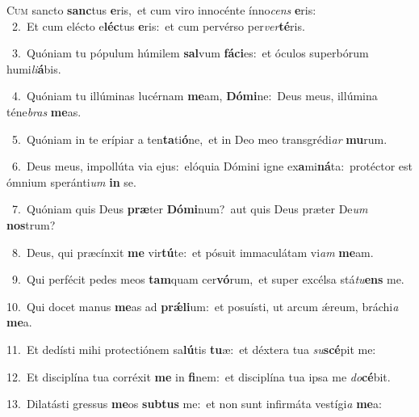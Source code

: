 \lettrine{\initial\textcolor{\initialcolor}{C}}{um} sancto \textbf{sanc}\-tus \textbf{e}\-ris,~\star et cum viro innocénte ínno\textit{cens} \textbf{e}\-ris:\\
{\numbfont\textcolor{\numbcolor}{~2.}}~Et cum elécto e\-\textbf{léc}\-tus \textbf{e}\-ris:~\star et cum pervérso per\-\textit{ver}\-\textbf{té}ris.\par
{\numbfont\textcolor{\numbcolor}{~3.}}~Quóniam tu pópulum húmilem \textbf{sal}\-vum \textbf{fá}\-\textbf{ci}es:~\star et óculos superbórum humi\-\textit{li}\-\textbf{á}bis.\par
{\numbfont\textcolor{\numbcolor}{~4.}}~Quóniam tu illúminas lucérnam \textbf{me}\-am, \textbf{Dó}\-\textbf{mi}ne:~\star Deus meus, illúmina téne\textit{bras} \textbf{me}\-as.\par
{\numbfont\textcolor{\numbcolor}{~5.}}~Quóniam in te erípiar a ten\-\textbf{ta}\-ti\-\textbf{ó}\-ne,~\star et in Deo meo transgrédi\textit{ar} \textbf{mu}\-rum.\par
{\numbfont\textcolor{\numbcolor}{~6.}}~Deus meus, impollúta via ejus:~\dagger elóquia Dómini igne ex\-\textbf{a}\-mi\-\textbf{ná}\-ta:~\star protéctor est ómnium speránti\textit{um} \textbf{in} se.\par
{\numbfont\textcolor{\numbcolor}{~7.}}~Quóniam quis Deus \textbf{præ}\-ter \textbf{Dó}\-\textbf{mi}num?~\star aut quis Deus præter De\textit{um} \textbf{nos}\-trum?\par
{\numbfont\textcolor{\numbcolor}{~8.}}~Deus, qui præcínxit \textbf{me} vir\-\textbf{tú}\-te:~\star et pósuit immaculátam vi\textit{am} \textbf{me}\-am.\par
{\numbfont\textcolor{\numbcolor}{~9.}}~Qui perfécit pedes meos \textbf{tam}\-quam cer\-\textbf{vó}\-rum,~\star et super excélsa stá\-\textit{tu}\-\textbf{ens} me.\par
{\numbfont\textcolor{\numbcolor}{10.}}~Qui docet manus \textbf{me}\-as ad \textbf{prǽ}\-\textbf{li}um:~\star et posuísti, ut arcum ǽreum, bráchi\textit{a} \textbf{me}\-a.\par
{\numbfont\textcolor{\numbcolor}{11.}}~Et dedísti mihi protectiónem sa\-\textbf{lú}\-tis \textbf{tu}\-æ:~\star et déxtera tua \textit{su}\-\textbf{scé}pit me:\par
{\numbfont\textcolor{\numbcolor}{12.}}~Et disciplína tua corréxit \textbf{me} in \textbf{fi}\-nem:~\star et disciplína tua ipsa me \textit{do}\-\textbf{cé}bit.\par
{\numbfont\textcolor{\numbcolor}{13.}}~Dilatásti gressus \textbf{me}\-os \textbf{sub}\-\textbf{tus} me:~\star et non sunt infirmáta vestígi\textit{a} \textbf{me}\-a:\par
